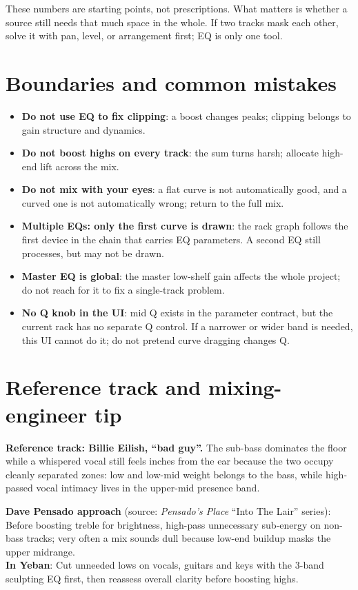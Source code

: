 These numbers are starting points, not prescriptions. What matters is whether a source still needs that much space in the whole. If two tracks mask each other, solve it with pan, level, or arrangement first; EQ is only one tool.

\section{Boundaries and common mistakes}

\begin{itemize}
  \item \textbf{Do not use EQ to fix clipping}: a boost changes peaks; clipping belongs to gain structure and dynamics.
  \item \textbf{Do not boost highs on every track}: the sum turns harsh; allocate high-end lift across the mix.
  \item \textbf{Do not mix with your eyes}: a flat curve is not automatically good, and a curved one is not automatically wrong; return to the full mix.
  \item \textbf{Multiple EQs: only the first curve is drawn}: the rack graph follows the first device in the chain that carries EQ parameters. A second EQ still processes, but may not be drawn.
  \item \textbf{Master EQ is global}: the master low-shelf gain affects the whole project; do not reach for it to fix a single-track problem.
  \item \textbf{No Q knob in the UI}: mid Q exists in the parameter contract, but the current rack has no separate Q control. If a narrower or wider band is needed, this UI cannot do it; do not pretend curve dragging changes Q.
\end{itemize}

\section{Reference track and mixing-engineer tip}

\textbf{Reference track: Billie Eilish, ``bad guy''.} The sub-bass dominates the floor while a whispered vocal still feels inches from the ear because the two occupy cleanly separated zones: low and low-mid weight belongs to the bass, while high-passed vocal intimacy lives in the upper-mid presence band.

\begin{tipbox}
\textbf{Dave Pensado approach} (source: \emph{Pensado's Place} ``Into The Lair'' series): Before boosting treble for brightness, high-pass unnecessary sub-energy on non-bass tracks; very often a mix sounds dull because low-end buildup masks the upper midrange.\\
\textbf{In Yeban}: Cut unneeded lows on vocals, guitars and keys with the 3-band sculpting EQ first, then reassess overall clarity before boosting highs.
\end{tipbox}

